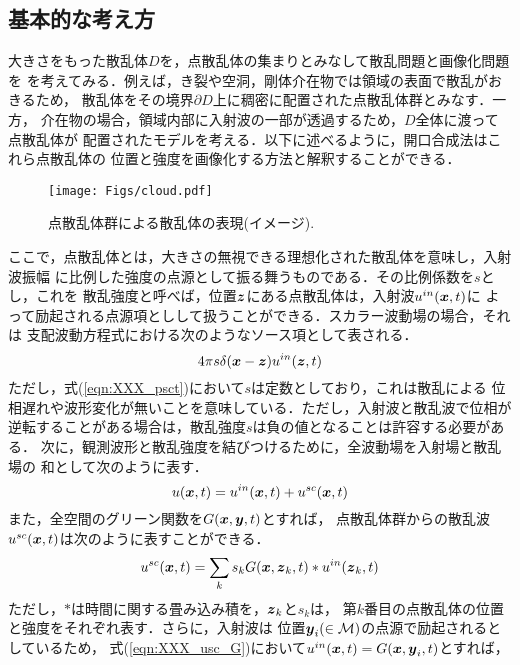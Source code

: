 \subsection{基本的な考え方}
大きさをもった散乱体$D$を，点散乱体の集まりとみなして散乱問題と画像化問題を
を考えてみる．例えば，き裂や空洞，剛体介在物では領域の表面で散乱がおきるため，
散乱体をその境界$\partial D$上に稠密に配置された点散乱体群とみなす．一方，
介在物の場合，領域内部に入射波の一部が透過するため，$D$全体に渡って点散乱体が
配置されたモデルを考える．以下に述べるように，開口合成法はこれら点散乱体の
位置と強度を画像化する方法と解釈することができる．
\begin{figure}[h]
	\begin{center}
	\texttt{[image: Figs/cloud.pdf]} 
	\end{center}
	\caption{点散乱体群による散乱体の表現(イメージ).} 
	\label{fig:XXX_cloud}
\end{figure}
ここで，点散乱体とは，大きさの無視できる理想化された散乱体を意味し，入射波振幅
に比例した強度の点源として振る舞うものである．その比例係数を$s$とし，これを
散乱強度と呼べば，位置$\mbox{\boldmath $z$}$にある点散乱体は，入射波$u^{in}(\mbox{\boldmath $x$},t)$に
よって励起される点源項としして扱うことができる．スカラー波動場の場合，それは
支配波動方程式における次のようなソース項として表される．
\begin{equation}
	4\pi s\delta (\mbox{\boldmath $x$}-\mbox{\boldmath $z$})u^{in}(\mbox{\boldmath $z$},t)
	\label{eqn:XXX_psct}
\end{equation}
ただし，式(\ref{eqn:XXX_psct})において$s$は定数としており，これは散乱による
位相遅れや波形変化が無いことを意味している．ただし，入射波と散乱波で位相が
逆転することがある場合は，散乱強度$s$は負の値となることは許容する必要がある．
次に，観測波形と散乱強度を結びつけるために，全波動場を入射場と散乱場の
和として次のように表す．
\begin{equation}
	u(\mbox{\boldmath $x$},t)=u^{in}(\mbox{\boldmath $x$},t)+u^{sc}(\mbox{\boldmath $x$},t)
	\label{eqn:XXX_utot}
\end{equation}
また，全空間のグリーン関数を$G(\mbox{\boldmath $x$},\mbox{\boldmath $y$},t)$とすれば，
点散乱体群からの散乱波$u^{sc}(\mbox{\boldmath $x$},t)$は次のように表すことができる．
\begin{equation}
	u^{sc}(\mbox{\boldmath $x$},t)=\sum_k s_k G(\mbox{\boldmath $x$},\mbox{\boldmath $z$}_k,t)*u^{in}(\mbox{\boldmath $z$}_k,t)
	\label{eqn:XXX_usc_G}
\end{equation}
ただし，$*$は時間に関する畳み込み積を，$\mbox{\boldmath $z$}_k$と$s_k$は，
第$k$番目の点散乱体の位置と強度をそれぞれ表す．さらに，入射波は
位置$\mbox{\boldmath $y$}_i(\in {\cal M})$の点源で励起されるとしているため，
式(\ref{eqn:XXX_usc_G})において$u^{in}(\mbox{\boldmath $x$},t)=G(\mbox{\boldmath $x$},\mbox{\boldmath $y$}_i,t)$とすれば，
